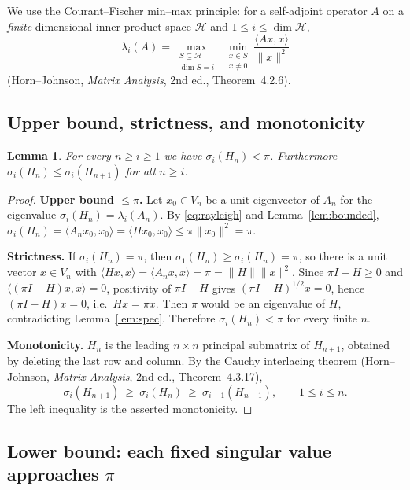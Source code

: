 \documentclass[12pt]{article}
\newtheorem{lemma}{Lemma}
\theoremstyle{remark}
\begin{document}
We use the Courant--Fischer min--max principle: for a self-adjoint operator $A$ on a
\emph{finite}-dimensional inner product space $\mathcal H$ and $1\le i\le\dim\mathcal H$,
\begin{equation}\label{eq:minmax}
\lambda_i(A)=\max_{\substack{S\subseteq \mathcal H \\ \dim S=i}}\ \min_{\substack{x\in S\\ x\neq0}}
\frac{\langle Ax,x\rangle}{\|x\|^2}
\end{equation}
(Horn--Johnson, \emph{Matrix Analysis}, 2nd ed., Theorem~4.2.6).

\subsection{Upper bound, strictness, and monotonicity}

\begin{lemma}\label{lem:upper}
For every $n\ge i\ge1$ we have $\sigma_i(H_n)<\pi$. Furthermore
$\sigma_i(H_{n})\le\sigma_i(H_{n+1})$ for all $n\ge i$.
\end{lemma}

\begin{proof}
\textbf{Upper bound $\le\pi$.} Let $x_0\in V_n$ be a unit eigenvector of $A_n$ for the eigenvalue
$\sigma_i(H_n)=\lambda_i(A_n)$. By \eqref{eq:rayleigh} and Lemma~\ref{lem:bounded},
$\sigma_i(H_n)=\langle A_nx_0,x_0\rangle=\langle Hx_0,x_0\rangle\le\pi\|x_0\|^2=\pi$.

\textbf{Strictness.} If $\sigma_i(H_n)=\pi$, then $\sigma_1(H_n)\ge\sigma_i(H_n)=\pi$, so there is
a unit vector $x\in V_n$ with $\langle Hx,x\rangle=\langle A_nx,x\rangle=\pi=\|H\|\|x\|^2$. Since
$\pi I-H\ge0$ and $\langle(\pi I-H)x,x\rangle=0$, positivity of $\pi I-H$ gives
$(\pi I-H)^{1/2}x=0$, hence $(\pi I-H)x=0$, i.e.\ $Hx=\pi x$. Then $\pi$ would be an eigenvalue of
$H$, contradicting Lemma~\ref{lem:spec}. Therefore $\sigma_i(H_n)<\pi$ for every finite $n$.

\textbf{Monotonicity.} $H_n$ is the leading $n\times n$ principal submatrix of $H_{n+1}$,
obtained by deleting the last row and column. By the Cauchy interlacing theorem
(Horn--Johnson, \emph{Matrix Analysis}, 2nd ed., Theorem~4.3.17),
\[
\sigma_{i}(H_{n+1})\ \ge\ \sigma_{i}(H_{n})\ \ge\ \sigma_{i+1}(H_{n+1}),\qquad 1\le i\le n .
\]
The left inequality is the asserted monotonicity.
\end{proof}

\subsection{Lower bound: each fixed singular value approaches $\pi$}
\end{document}

